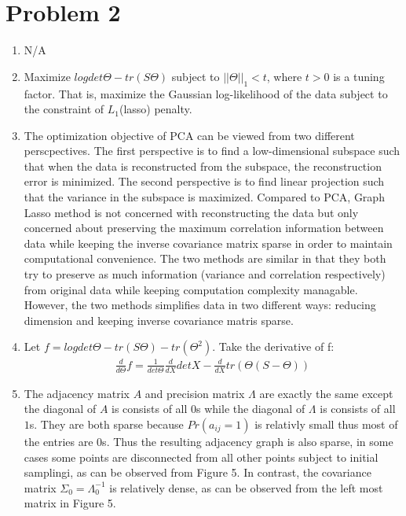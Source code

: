 \documentclass{article}
\begin{document}
\section{Problem 2}
\begin{enumerate}
\item
    N/A
\item
    Maximize $log det\Theta - tr(S\Theta)$ subject to $||\Theta||_1 < t$, where $t > 0$ is a tuning factor. That is, maximize the Gaussian log-likelihood of the data subject to the constraint of $L_1$(lasso) penalty.
\item
    The optimization objective of PCA can be viewed from two different perscpectives. The first perspective is to find a low-dimensional subspace such that when the data is reconstructed from the subspace, the reconstruction error is minimized. The second perspective is to find linear projection such that the variance in the subspace is maximized. Compared to PCA, Graph Lasso method is not concerned with reconstructing the data but only concerned about preserving the maximum correlation information between data while keeping the inverse covariance matrix sparse in order to maintain computational convenience. The two methods are similar in that they both try to preserve as much information (variance and correlation respectively) from original data while keeping computation complexity managable. However, the two methods simplifies data in two different ways: reducing dimension and keeping inverse covariance matris sparse.
\item
    Let $f = logdet\Theta - tr(S\Theta) - tr(\Theta^2)$. Take the derivative of f:
    \begin{equation}
    \begin{split}
        \frac{d}{d\Theta}f = \frac{1}{det \Theta}\frac{d}{dX}det X - \frac{d}{dX} tr(\Theta(S-\Theta))
    \end{split}
    \end{equation}
\item
    The adjacency matrix $A$ and precision matrix $\Lambda$ are exactly the same except the diagonal of $A$ is consists of all $0$s while the diagonal of $\Lambda$ is consists of all $1$s. They are both sparse because $Pr(a_{ij} = 1)$ is relativly small thus most of the entries are $0$s. Thus the resulting adjacency graph is also sparse, in some cases some points are disconnected from all other points subject to initial samplingi, as can be observed from Figure 5. In contrast, the covariance matrix $\Sigma_0 = \Lambda_0^{-1}$ is relatively dense, as can be observed from the left most matrix in Figure 5.

\end{enumerate}
\end{document}
